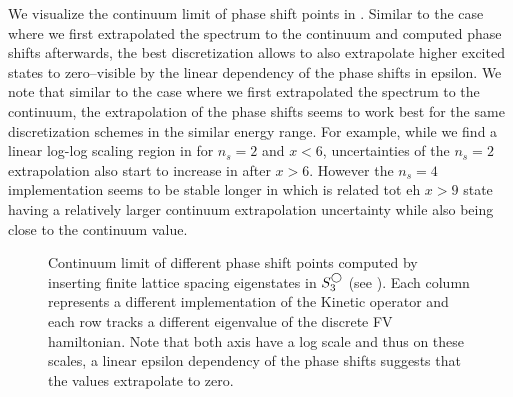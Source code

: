We visualize the continuum limit of phase shift points in .
Similar to the case where we first extrapolated the spectrum to the continuum and computed phase shifts afterwards, the best discretization allows to also extrapolate higher excited states to zero--visible by the linear dependency of the phase shifts in epsilon.
We note that similar to the case where we first extrapolated the spectrum to the continuum, the extrapolation of the phase shifts seems to work best for the same discretization schemes in the similar energy range.
For example, while we find a linear log-log scaling region in  for $n_s = 2$ and $x<6$, uncertainties of the $n_s =2$ extrapolation also start to increase in  after $x>6$.
However the $n_s = 4$ implementation seems to be stable longer in  which is related tot eh $x>9$ state having a relatively larger continuum extrapolation uncertainty while also being close to the continuum value.


\begin{figure}[th]
    \scalebox{1.0}{}
    \caption{
        \label{fig:iv-continuum}
        Continuum limit of different phase shift points computed by inserting finite lattice spacing eigenstates in $S^{\bigcirc}_3$ (see ).
        Each column represents a different implementation of the Kinetic operator and each row tracks a different eigenvalue of the discrete FV hamiltonian.
        Note that both axis have a log scale and thus on these scales, a linear epsilon dependency of the phase shifts suggests that the values extrapolate to zero.
    }
\end{figure}

